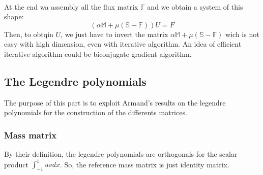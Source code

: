 \documentclass[a4paper,10pt,draft]{article}
\begin{document}
\paragraph{}
At the end wa assembly all the flux matrix $\mathbb{F}$ and we obtain a system of this shape:
\begin{equation}
\left(\alpha \mathbb{M} + \mu (\mathbb{S}-\mathbb{F})\right) U = F
\end{equation}
Then, to obtqin $U$, we just have to invert the matrix $\alpha \mathbb{M} + \mu 
(\mathbb{S}-\mathbb{F})$ wich is not easy with high dimension, even with iterative algorithm. An 
idea of efficient iterative algorithm could be biconjugate gradient algorithm.

\subsection{The Legendre polynomials}

The purpose of this part is to exploit Armand's results on the legendre polynomials for the 
construction of the differents matrices.

\subsubsection{Mass matrix}
By their definition, the legendre polynomials are orthogonals for the scalar product 
$\int_{-1}^1 uv dx$. So, the reference mass matrix is just identity matrix.
\end{document}
